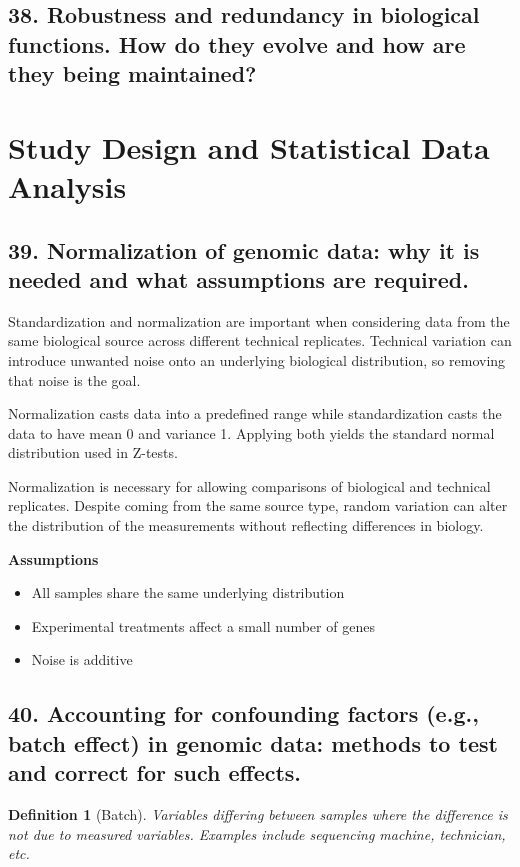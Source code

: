 \documentclass{tufte-handout}
\theoremstyle{noparens}
\newtheorem*{define}{Definition}
\begin{document}
\newpage
\subsection{38. Robustness and redundancy in biological functions. How do they evolve and how are they being maintained?}

\newpage
\section{Study Design and Statistical Data Analysis}\label{sec:stats}

\subsection{39. Normalization of genomic data: why it is needed and what assumptions are required.}

Standardization and normalization are important when considering data from the same biological source across different technical replicates. Technical variation can introduce unwanted noise onto an underlying biological distribution, so removing that noise is the goal.

Normalization casts data into a predefined range while standardization casts the data to have mean 0 and variance 1. Applying both yields the standard normal distribution used in Z-tests. 

Normalization is necessary for allowing comparisons of biological and technical replicates. Despite coming from the same source type, random variation can alter the distribution of the measurements without reflecting differences in biology.

\noindent
\textbf{Assumptions}

\begin{itemize}
	\item All samples share the same underlying distribution
	\item Experimental treatments affect a small number of genes
	\item Noise is additive
\end{itemize}

\newpage
\subsection{40. Accounting for confounding factors (e.g., batch effect) in genomic data: methods to test and correct for such effects.}
\begin{define}[Batch]
Variables differing between samples where the difference is not due to measured variables. Examples include sequencing machine, technician, etc.
\end{define}
\end{document}
